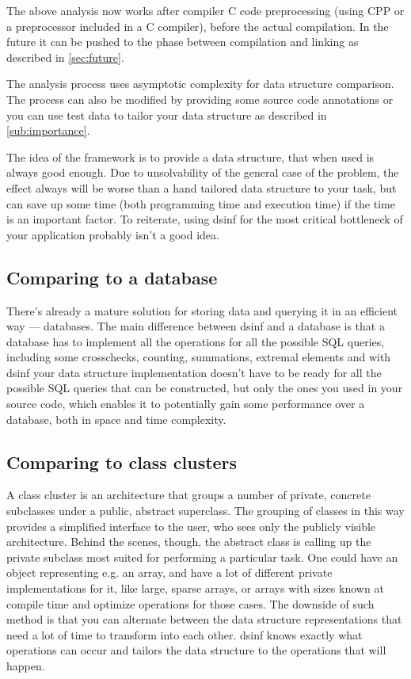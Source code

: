 \documentclass[a4paper,11pt]{article}
\begin{document}
		The above analysis now works after compiler C code preprocessing (using CPP or a preprocessor included in a C compiler), before the actual compilation. In the future it can be
		pushed to the phase between compilation and linking as described in \autoref{sec:future}.

		The analysis process uses asymptotic complexity for data structure comparison. The process can also be
		modified by providing some source code annotations or you can use test data to tailor your data
		structure as described in \autoref{sub:importance}.

		The idea of the framework is to provide a data structure, that when used is always good enough. Due to
		unsolvability of the general case of the problem, the effect always will be worse than a hand tailored
		data structure to your task, but can save up some time (both programming time and execution time) if the
        time is an important factor. To reiterate, using dsinf for the most critical bottleneck of your
		application probably isn't a good idea.

	\subsection{Comparing to a database} \label{sub:database}
        There's already a mature solution for storing data and querying it in an efficient way --- databases.
		The main difference between dsinf and a database is that a database has to implement all the operations
		for all the possible SQL queries, including some crosschecks, counting, summations, extremal elements
		and with dsinf your data structure implementation doesn't have to be ready for all the possible SQL
		queries that can be constructed, but only the ones you used in your source code, which enables it to
		potentially gain some performance over a database, both in space and time complexity.

	\subsection{Comparing to class clusters} \label{sub:classcluster}
		A class cluster is an architecture that groups a number of private, concrete subclasses under a public,
		abstract superclass. The grouping of classes in this way provides a simplified interface to the user,
		who sees only the publicly visible architecture. Behind the scenes, though, the abstract class is
		calling up the private subclass most suited for performing a particular task\cite{AppleCC}. One could
		have an object representing e.g. an array, and have a lot of different private implementations for it, like
		large, sparse arrays, or arrays with sizes known at compile time and optimize operations for those
		cases. The downside of such method is that you can alternate between the data structure representations
		that need a lot of time to transform into each other. dsinf knows exactly what operations can occur and
		tailors the data structure to the operations that will happen.
\end{document}
